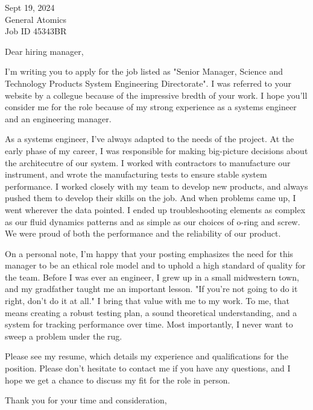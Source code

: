 \documentclass[a4paper, 10pt]{letter}
\begin{document}
\begin{letter}
{
    Sept 19, 2024\\
    General Atomics\\
    Job ID 45343BR
}

\opening{Dear hiring manager,}

I'm writing you to apply for the job listed as "Senior Manager, Science and Technology Products System Engineering Directorate".  I was referred to your website by a collegue
because of the impressive bredth of your work. I hope you'll consider
me for the role because of my strong experience as a systems engineer and an engineering manager.

As a systems engineer, I've always adapted to the needs of the project. At the early phase of my career, I was responsible for making big-picture decisions about
the architecutre of our system. I worked with contractors to manufacture our instrument, and wrote the manufacturing tests to ensure stable system performance. I worked closely with 
my team to develop new products, and always pushed them to develop their skills on the job. And when problems came up, I went wherever
the data pointed. I ended up troubleshooting elements as complex as our fluid dynamics patterns and as simple as our choices of o-ring
and screw. We were proud of both the performance and the reliability of our product.

On a personal note, I'm happy that your posting emphasizes the need for this manager to be an ethical role model and to uphold a high standard of quality 
for the team. Before I was ever an engineer, I grew up in a small midwestern town, and my gradfather taught me an important lesson. "If you're not going to
do it right, don't do it at all." I bring that value with me to my work. To me, that means creating a robust testing plan, a sound theoretical understanding, and a system for 
tracking performance over time. Most importantly, I never want to sweep a problem under the rug. 

Please see my resume, which details my experience and qualifications for the position. Please don't hesitate to contact me if you have any questions, and I hope we 
get a chance to discuss my fit for the role in person. 

\closing{Thank you for your time and consideration,}

\end{letter}
\end{document}
